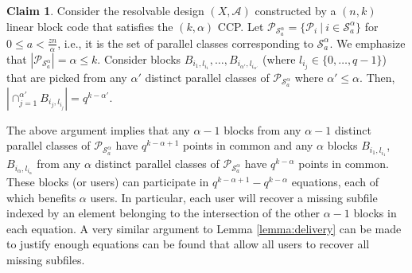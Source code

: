 \documentclass[journal,twocolumn]{IEEEtran}
\theoremstyle{definition}
\newtheorem{claim}{Claim}
\newcommand{\calA}{\mathcal{A}}
\newcommand{\calP}{\mathcal{P}}
\newcommand{\calS}{\mathcal{S}}
\newcommand{\litang}[1]{\marginpar{+}{\bf Li's remark}: {\em #1}}
\begin{document}
\begin{claim}
	\label{claim:MDSintersectionKAlpha}
	Consider the resolvable design $(X, \calA)$ constructed by a $(n,k)$ linear block code that satisfies the $(k,\alpha)$ CCP. Let $\calP_{\calS^\alpha_a}=\{\calP_i~|~i\in \calS^\alpha_a\}$ for $0\le a< \frac{zn}{\alpha}$, i.e., it is the set of parallel classes corresponding to $\calS^\alpha_a$. We emphasize that $|\calP_{\calS^\alpha_a}| = \alpha\le k$. Consider blocks $B_{i_1, l_{i_1}}, \dots, B_{i_{\alpha'}, l_{i_{\alpha'}}}$ (where $l_{i_j} \in \{0, \dots, q-1\}$) that are picked from any $\alpha'$ distinct parallel classes of $\calP_{\calS^\alpha_a}$ where $\alpha'\le \alpha$. Then, $|\cap_{j=1}^{\alpha'} B_{i_j, l_{i_j}}| = q^{k-\alpha'}$.
\end{claim}
	The above argument implies that any $\alpha-1$ blocks from any $\alpha-1$ distinct parallel classes of $\calP_{\calS^\alpha_a}$ have $q^{k-\alpha+1}$ points in common and any $\alpha$ blocks $B_{i_1,l_{i_1}}$, $B_{i_\alpha,l_{i_\alpha}}$ from any $\alpha$ distinct parallel classes of $\calP_{\calS^{\alpha}_a}$ have $q^{k-\alpha}$ points in common. These blocks (or users) can participate in $q^{k-\alpha+1}-q^{k-\alpha}$ equations, each of which benefits $\alpha$ users. In particular, each user will recover a missing subfile indexed by an element belonging to the intersection of the other $\alpha-1$ blocks in each equation. A very similar argument to Lemma \ref{lemma:delivery} can be made to justify enough equations can be found that allow all users to recover all missing subfiles. %
\end{document}
